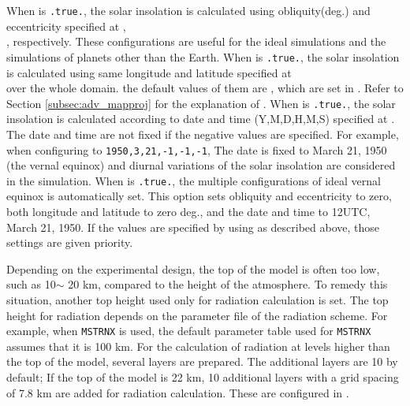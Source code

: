When  is \verb|.true.|,
the solar insolation is calculated using obliquity(deg.) and eccentricity
specified at , \\
, respectively.
These configurations are useful for the ideal simulations and the simulations of planets other than the Earth.
%
When  is \verb|.true.|,
the solar insolation is calculated using same longitude and latitude
specified at \\
 over the whole domain.
the default values of them are ,
which are set in .
Refer to Section \ref{subsec:adv_mapproj} for the explanation of .
%
When  is \verb|.true.|,
the solar insolation is calculated according to date and time (Y,M,D,H,M,S) specified at .
The date and time are not fixed if the negative values are specified.
For example, when configuring  to \verb|1950,3,21,-1,-1,-1|,
The date is fixed to March 21, 1950 (the vernal equinox)
and diurnal variations of the solar insolation are considered in the simulation.
%
When  is \verb|.true.|,
the multiple configurations of ideal vernal equinox is automatically set.
This option sets obliquity and eccentricity to zero, both longitude and latitude to zero deg., and the date and time to 12UTC, March 21, 1950.
If the values are specified by using  as described above,
those settings are given priority.

Depending on the experimental design, the top of the model is often too low, such as 10$\sim$ 20 km, compared to the height of the atmosphere.
To remedy this situation, another top height used only for radiation calculation is set.
The top height for radiation depends on the parameter file of the radiation scheme.
For example, when \verb|MSTRNX| is used, the default parameter table used for \verb|MSTRNX| assumes that it is 100 km.
%
For the calculation of radiation at levels higher than the top of the model, several layers are prepared.
The additional layers are 10 by default;
If the top of the model is 22 km, 10 additional layers with a grid spacing of 7.8 km are added for radiation calculation.
These are configured in .\\

